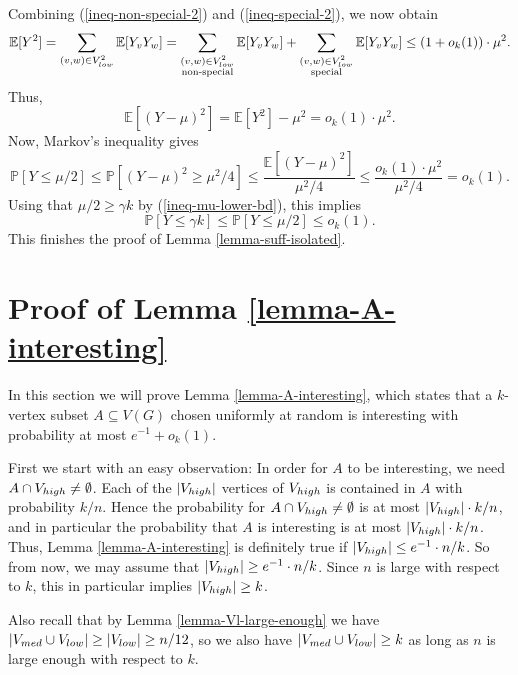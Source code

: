 \documentclass[11pt]{article}
\theoremstyle{definition}
\numberwithin{equation}{section}
\begin{document}
Combining (\ref{ineq-non-special-2}) and (\ref{ineq-special-2}), we now obtain
\[\mathbb{E}[Y^2]=\sum_{(v,w)\in V_{\textnormal{low}}^2}\mathbb{E}[Y_vY_w]=\sum_{\substack{(v,w)\in V_{\textnormal{low}}^2\\\text{non-special}}}\mathbb{E}[Y_vY_w]+\sum_{\substack{(v,w)\in V_{\textnormal{low}}^2\\\text{special}}}\mathbb{E}[Y_vY_w]\leq (1+o_k(1))\cdot\mu^2.\]
Thus,
\[\mathbb{E}[(Y-\mu)^2]=\mathbb{E}[Y^2]-\mu^2=o_k(1)\cdot \mu^2.\]
Now, Markov's inequality gives
\[\mathbb{P}[Y\leq \mu/2]\leq \mathbb{P}[(Y-\mu)^2\geq \mu^2/4]\leq \frac{\mathbb{E}[(Y-\mu)^2]}{\mu^2/4}\leq \frac{o_k(1)\cdot \mu^2}{\mu^2/4}=o_k(1).\]
Using that $\mu/2\geq \gamma k$ by (\ref{ineq-mu-lower-bd}), this implies
\[\mathbb{P}[Y\leq \gamma k]\leq \mathbb{P}[Y\leq \mu/2]\leq o_k(1).\]
This finishes the proof of Lemma \ref{lemma-suff-isolated}.

\section{Proof of Lemma \ref{lemma-A-interesting}}\label{sect-A-interesting}

In this section we will prove Lemma \ref{lemma-A-interesting}, which states that a $k$-vertex subset $A\subseteq V(G)$ chosen uniformly at random is interesting with probability at most $e^{-1}+o_k(1)$.

First we start with an easy observation: In order for $A$ to be interesting, we need $A\cap V_{\textnormal{high}}\neq \emptyset$. Each of the $\vert V_{\textnormal{high}}\vert$ vertices of $V_{\textnormal{high}}$ is contained in $A$ with probability $k/n$. Hence the probability for $A\cap V_{\textnormal{high}}\neq \emptyset$ is at most $\vert V_{\textnormal{high}}\vert\cdot k/n$, and in particular the probability that $A$ is interesting is at most $\vert V_{\textnormal{high}}\vert\cdot k/n$. Thus, Lemma \ref{lemma-A-interesting} is definitely true if $\vert V_{\textnormal{high}}\vert\leq e^{-1}\cdot n/k$. So from now, we may assume that $\vert V_{\textnormal{high}}\vert\geq e^{-1}\cdot n/k$. Since $n$ is large with respect to $k$, this in particular implies $\vert V_{\textnormal{high}}\vert \geq k$.

Also recall that by Lemma \ref{lemma-Vl-large-enough} we have $\vert V_{\textnormal{med}}\cup V_{\textnormal{low}}\vert\geq \vert V_{\textnormal{low}}\vert\geq n/12$, so we also have $\vert V_{\textnormal{med}}\cup V_{\textnormal{low}}\vert\geq k$ as long as $n$ is large enough with respect to $k$.
\end{document}
